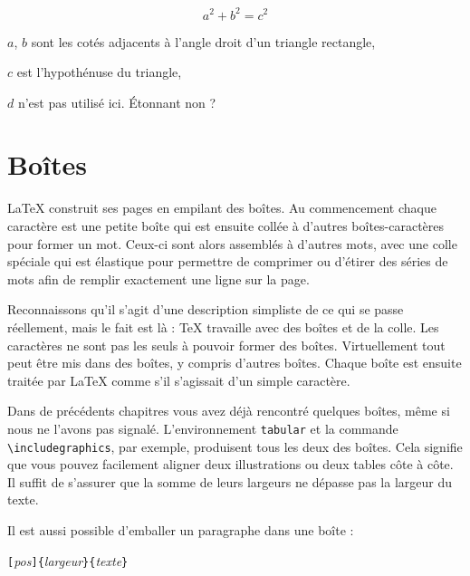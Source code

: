 \begin{example}
\flushleft
\newenvironment{vardesc}[1]{%
  \settowidth{\parindent}{#1\ }
  \makebox[0pt][r]{#1\ }}{}
\begin{displaymath}
a^2+b^2=c^2
\end{displaymath}

\begin{vardesc}{Où :}$a$,
$b$ sont les cotés adjacents à
l'angle droit d'un triangle
rectangle,\par
$c$ est l'hypothénuse du
triangle,\par
$d$ n'est pas utilisé ici.
\'Etonnant non ?
\end{vardesc}
\end{example}


\section{Boîtes}

\LaTeX{} construit ses pages en empilant des boîtes. Au commencement
chaque caractère est une petite boîte qui est ensuite collée à
d'autres boîtes-caractères pour former un mot. Ceux-ci sont alors
assemblés à d'autres mots, avec une colle spéciale qui est élastique
pour permettre de comprimer ou d'étirer des séries de mots afin de
remplir exactement une ligne sur la page.

Reconnaissons qu'il s'agit d'une description simpliste de ce
qui se passe réellement, mais le fait est là : \TeX{} travaille avec
des boîtes et de la colle. Les caractères ne sont pas les seuls à
pouvoir former des boîtes. Virtuellement tout peut être mis dans des
boîtes, y compris d'autres boîtes. Chaque boîte est ensuite traitée
par \LaTeX{} comme s'il s'agissait d'un simple caractère.

Dans de précédents chapitres vous avez déjà rencontré quelques
boîtes, même si nous ne l'avons pas signalé. L'environnement
\verb|tabular| et la commande \verb|\includegraphics|, par exemple,
produisent tous les deux des boîtes. Cela signifie que vous pouvez
facilement aligner deux illustrations ou deux tables côte à côte. Il
suffit de s'assurer que la somme de leurs largeurs ne dépasse pas la
largeur du texte.

Il est aussi possible d'emballer un paragraphe dans une boîte  :
\begin{lscommand}
\verb|[|\emph{pos}\verb|]{|\emph{largeur}\verb|}{|\emph{texte}\verb|}|
\end{lscommand}

